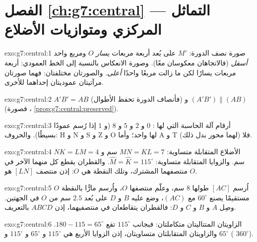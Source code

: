 \section*{الفصل \ref{ch:g7:central} --- التماثل المركزي ومتوازيات الأضلاع}

\begin{solution}{exo:g7:central:1}
صورة نصف الدورة: $M'$ على بُعد أربعة مربعات \emph{يسار} $O$ ومربع
واحد \emph{أسفل} (فالاتجاهان معكوسان معًا). وصورة الانعكاس
بالنسبة إلى الخط العمودي: أربعة مربعات يسارًا لكن ما زالت مربعًا واحدًا
\emph{أعلى}. والصورتان مختلفتان: فهما صورتان مرآتيتان عموديتان
إحداهما للأخرى.
\end{solution}

\begin{solution}{exo:g7:central:2}
$A'B' = AB$ (فأنصاف الدورة تحفظ الأطوال) و
$(A'B') \parallel (AB)$ (فصورة   ،
\cref{prop:g7:central:preserved}).
\end{solution}

\begin{solution}{exo:g7:central:3}
أرقام آلة الحاسبة التي لها : $0$ و $2$ و $5$ و $8$ (و
$1$ إذا رُسم عمودًا بسيطًا). والحروف: H و N و S و Z و O لها واحد؛ وأما A و
T فلا (لهما محور بدل ذلك).
\end{solution}

\begin{solution}{exo:g7:central:4}
الأضلاع المتقابلة متساوية: $MN = KL = 7$ سم و $NK = LM = 4$ سم. والزوايا
المتقابلة متساوية: $\widehat M = \widehat K = 115^\circ$. والقطران
يقطع كل منهما الآخر في منتصفهما المشترك، وتلك النقطة هي $O$: إذن
منتصف $[LN]$ هو $O$.
\end{solution}

\begin{solution}{exo:g7:central:5}
اُرسم  $[AC]$ طولها $8$ سم، وعلّم منتصفها $O$، واُرسم مارًّا
بالنقطة $O$ مستقيمًا يصنع $60^\circ$ مع $(AC)$، وضع عليه $B$ و $D$
على بُعد $2.5$ سم من $O$ في الجهتين. وصِل $A$ و $B$ و $C$ و $D$: فالقطران
يتقاطعان في منتصفيهما، إذن $ABCD$ 
بالتعريف.
\end{solution}

\begin{solution}{exo:g7:central:6}
الزاويتان المتتاليتان متكاملتان: فبجانب $115^\circ$ تقع
$180 - 115 = 65^\circ$. والزاويتان المتقابلتان متساويتان، إذن الزوايا الأربع
هي $115^\circ$ و $65^\circ$ و $115^\circ$ و $65^\circ$ (
$360^\circ$).
\end{solution}

